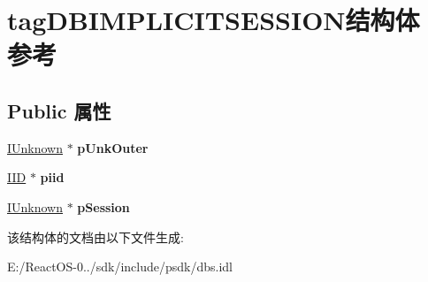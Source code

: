\hypertarget{structtag_d_b_i_m_p_l_i_c_i_t_s_e_s_s_i_o_n}{}\section{tag\+D\+B\+I\+M\+P\+L\+I\+C\+I\+T\+S\+E\+S\+S\+I\+O\+N结构体 参考}
\label{structtag_d_b_i_m_p_l_i_c_i_t_s_e_s_s_i_o_n}
\subsection*{Public 属性}
\begin{DoxyCompactItemize}
\item 
\mbox{\label{structtag_d_b_i_m_p_l_i_c_i_t_s_e_s_s_i_o_n_a70dfb2e39d4e1c01bb3b458e3a5f8f0b}} 
\hyperlink{interface_i_unknown}{I\+Unknown} $\ast$ {\bfseries p\+Unk\+Outer}
\item 
\mbox{\label{structtag_d_b_i_m_p_l_i_c_i_t_s_e_s_s_i_o_n_af8145a0e09fcc52a677855236b5d1098}} 
\hyperlink{struct___i_i_d}{I\+ID} $\ast$ {\bfseries piid}
\item 
\mbox{\label{structtag_d_b_i_m_p_l_i_c_i_t_s_e_s_s_i_o_n_a0f7264b82ae10da0e9c1b4cb1d12b310}} 
\hyperlink{interface_i_unknown}{I\+Unknown} $\ast$ {\bfseries p\+Session}
\end{DoxyCompactItemize}


该结构体的文档由以下文件生成\+:\begin{DoxyCompactItemize}
\item 
E\+:/\+React\+O\+S-\/0../sdk/include/psdk/dbs.\+idl\end{DoxyCompactItemize}
